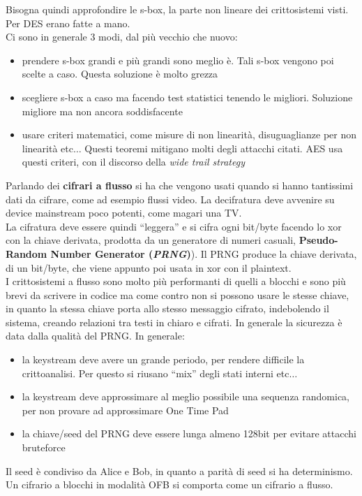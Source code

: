 \documentclass[a4paper,12pt, oneside]{book}
\begin{document}
Bisogna quindi approfondire le s-box, la parte non lineare dei crittosistemi
visti. Per DES erano fatte a mano.\\
Ci sono in generale 3 modi, dal più vecchio che nuovo:
\begin{itemize}
  \item prendere s-box grandi e più grandi sono meglio è. Tali s-box vengono poi
  scelte a caso. Questa soluzione è molto grezza
  \item scegliere s-box a caso ma facendo test statistici tenendo le
  migliori. Soluzione migliore ma non ancora soddisfacente
  \item usare criteri matematici, come misure di non linearità, disuguaglianze
  per non linearità etc$\ldots$ Questi teoremi mitigano molti degli attacchi
  citati. AES usa questi criteri, con il discorso della \textit{wide trail
    strategy} 
\end{itemize}
Parlando dei \textbf{cifrari a flusso} si ha che vengono usati quando si hanno
tantissimi dati da cifrare, come ad esempio flussi video. La decifratura deve
avvenire su device mainstream poco potenti, come magari una TV.\\
La cifratura deve essere quindi ``leggera'' e si cifra ogni bit/byte facendo lo
xor con la chiave derivata, prodotta da un generatore di numeri casuali,
\textbf{Pseudo-Random Number Generator (\textit{PRNG})}). Il PRNG produce la
chiave derivata, di un bit/byte, che viene appunto poi usata in xor con il
plaintext.\\
I crittosistemi a flusso sono molto più performanti di quelli a blocchi e sono
più brevi da scrivere in codice ma come contro non si possono usare le stesse
chiave, in quanto la stessa chiave porta allo stesso messaggio cifrato,
indebolendo il sistema, creando relazioni tra testi in chiaro e cifrati. In
generale la sicurezza è data dalla qualità del PRNG. In generale:
\begin{itemize}
  \item la keystream deve avere un grande periodo, per rendere difficile la
  crittoanalisi. Per questo si riusano ``mix'' degli stati interni etc$\ldots$
  \item la keystream deve approssimare al meglio possibile una sequenza
  randomica, per non provare ad approssimare One Time Pad
  \item la chiave/seed del PRNG deve essere lunga almeno 128bit per evitare
  attacchi bruteforce
\end{itemize}
Il seed è condiviso da Alice e Bob, in quanto a parità di seed si ha
determinismo.\\  
Un cifrario a blocchi in modalità OFB si comporta come un cifrario a flusso.\\
\end{document}

